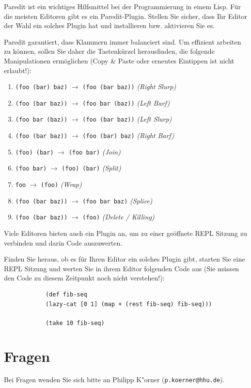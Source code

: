 \documentclass[11pt,a4paper]{article}
\begin{document}
	
	\begin{aufgabe}[Paredit]
		Paredit ist ein wichtiges Hilfsmittel bei der Programmierung in einem Lisp.
		F\"ur die meisten Editoren gibt es ein Paredit-Plugin.
		Stellen Sie sicher, dass Ihr Editor der Wahl ein solches Plugin hat
		und installieren bzw. aktivieren Sie es.
		
		
		Paredit garantiert, dass Klammern immer balanciert sind.
		Um effizient arbeiten zu k\"onnen, sollen Sie daher
		die Tastenk\"urzel herausfinden, die folgende Manipulationen erm\"oglichen
		(Copy \& Paste oder erneutes Eintippen ist nicht erlaubt!):
		
		\begin{enumerate}[label=\alph*)]
			\item
			\texttt{(foo (bar) baz)} $\longrightarrow$ \texttt{(foo (bar baz))} \textit{(Right Slurp)}
			\item
			\texttt{(foo (bar baz))} $\longrightarrow$ \texttt{(foo bar (baz))} \textit{(Left Barf)}
			\item
			\texttt{(foo bar (baz))} $\longrightarrow$ \texttt{(foo (bar baz))} \textit{(Left Slurp)}
			\item
			\texttt{(foo (bar baz))} $\longrightarrow$ \texttt{(foo (bar) baz)} \textit{(Right Barf)}
			\item
			\texttt{(foo) (bar)} $\longrightarrow$ \texttt{(foo bar)} \textit{(Join)}
			\item
			\texttt{(foo bar)} $\longrightarrow$ \texttt{(foo) (bar)} \textit{(Split)}
			\item
			\texttt{foo} $\longrightarrow$ \texttt{(foo)} \textit{(Wrap)}
			\item
			\texttt{(foo (bar baz))} $\longrightarrow$ \texttt{(foo bar baz)} \textit{(Splice)}
			\item
			\texttt{(foo (bar baz))} $\longrightarrow$ \texttt{(foo)} \textit{(Delete / Killing)}
		\end{enumerate}
		
	\end{aufgabe}
	
	\begin{aufgabe}
		Viele Editoren bieten auch ein Plugin an,
		um zu einer ge\"offnete REPL Sitzung zu verbinden
		und darin Code auszuwerten.
		
		Finden Sie heraus, ob es f\"ur Ihren Editor ein solches Plugin gibt,
		starten Sie eine REPL Sitzung und werten Sie in ihrem Editor folgenden
		Code aus (Sie m\"ussen den Code zu diesem Zeitpunkt noch nicht verstehen!):
		
		\begin{verbatim}
			(def fib-seq
			(lazy-cat [0 1] (map + (rest fib-seq) fib-seq)))
			
			(take 10 fib-seq)
		\end{verbatim}
	\end{aufgabe}
	
	
	\section*{Fragen}
	Bei Fragen wenden Sie sich bitte an Philipp K"orner (\texttt{p.koerner@hhu.de}).
\end{document}
